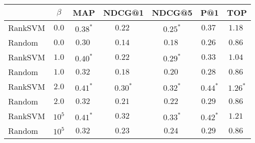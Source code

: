 \begin{tabular}{@{}lcccccc@{}}
  \toprule
    & $\beta$ & MAP & NDCG@1 & NDCG@5 & P@1 & TOP \\ \midrule
RankSVM & $0.0$ & $0.38^*$ & $0.22\;$ & $0.25^*$ & $0.37\;$ & $1.18\;$\\
Random & $0.0$ & $0.30\;$ & $0.14\;$ & $0.18\;$ & $0.26\;$ & $0.86\;$\\ \midrule
RankSVM & $1.0$ & $0.40^*$ & $0.22\;$ & $0.29^*$ & $0.33\;$ & $1.04\;$\\
Random & $1.0$ & $0.32\;$ & $0.18\;$ & $0.20\;$ & $0.28\;$ & $0.86\;$\\ \midrule
RankSVM & $2.0$ & $0.41^*$ & $0.30^*$ & $0.32^*$ & $0.44^*$ & $1.26^*$\\
Random & $2.0$ & $0.32\;$ & $0.21\;$ & $0.22\;$ & $0.29\;$ & $0.86\;$\\ \midrule
RankSVM & $10^5$ & $0.41^*$ & $0.32\;$ & $0.33^*$ & $0.42^*$ & $1.21\;$\\
Random & $10^5$ & $0.32\;$ & $0.23\;$ & $0.24\;$ & $0.29\;$ & $0.86\;$\\ 
\bottomrule
\end{tabular}
